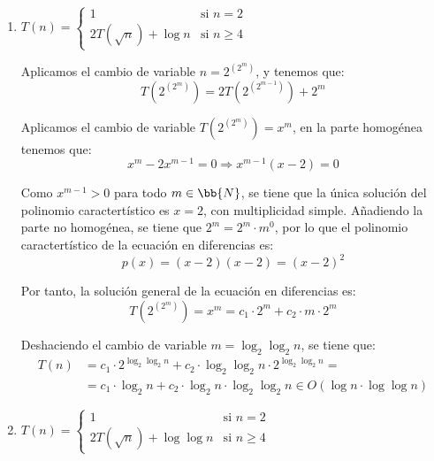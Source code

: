 \begin{ejercicio}
\begin{enumerate}[label=\alph*)]
        \item $T(n) = \begin{cases}
            1 & \text{si } n = 2 \\
            2T\left(\sqrt{n}\right) + \log n & \text{si } n \geq 4
        \end{cases}$

        Aplicamos el cambio de variable $n=2^{(2^m)}$, y tenemos que:
        \begin{equation*}
            T\left(2^{(2^m)}\right)=2T\left(2^{(2^{m-1})}\right) + 2^m
        \end{equation*}

        Aplicamos el cambio de variable $T\left(2^{(2^m)}\right)=x^m$, en la parte homogénea tenemos que:
        \begin{equation*}
            x^m - 2x^{m-1} = 0 \Longrightarrow x^{m-1}(x-2)=0
        \end{equation*}

        Como $x^{m-1}>0$ para todo $m\in \bb{N}$, se tiene que la única solución del polinomio caractertístico es $x=2$,
        con multiplicidad simple. Añadiendo la parte no homogénea, se tiene que $2^m = 2^m\cdot m^0$, por lo que el polinomio caractertístico
        de la ecuación en diferencias es:
        \begin{equation*}
            p(x) = (x-2)(x-2) = (x-2)^2
        \end{equation*}

        Por tanto, la solución general de la ecuación en diferencias es:
        \begin{equation*}
            T\left(2^{(2^m)}\right) = x^m = c_1\cdot 2^m + c_2\cdot m\cdot 2^m
        \end{equation*}

        Deshaciendo el cambio de variable $m=\log_2\log_2 n$, se tiene que:
        \begin{align*}
            T(n) &= c_1\cdot 2^{\log_2\log_2 n} + c_2\cdot \log_2\log_2 n\cdot 2^{\log_2\log_2 n}
            =\\&= c_1\cdot \log_2 n + c_2\cdot \log_2 n\cdot \log_2\log_2 n \in O(\log n\cdot \log\log n)
        \end{align*}

        \item $T(n) = \begin{cases}
            1 & \text{si } n = 2 \\
            2T\left(\sqrt{n}\right) + \log \log n & \text{si } n \geq 4
        \end{cases}$


\end{enumerate}
\end{ejercicio}
